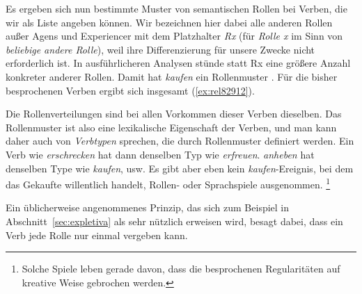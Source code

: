 

Es ergeben sich nun bestimmte Muster von semantischen Rollen bei Verben, die wir als Liste angeben können.
Wir bezeichnen hier dabei alle anderen Rollen außer Agens und Experiencer mit dem Platzhalter \textit{Rx} (für \textit{Rolle x} im Sinn von \textit{beliebige andere Rolle}), weil ihre Differenzierung für unsere Zwecke nicht erforderlich ist.
In ausführlicheren Analysen stünde statt Rx eine größere Anzahl konkreter anderer Rollen.
Damit hat \zB \textit{kaufen} ein Rollenmuster .
Für die bisher besprochenen Verben ergibt sich insgesamt (\ref{ex:rel82912}).

\begin{exe}
  \ex\label{ex:rel82912}
  \begin{xlist}
  \end{xlist}
\end{exe}

Die Rollenverteilungen sind bei allen Vorkommen dieser Verben dieselben.
Das Rollenmuster ist also eine lexikalische Eigenschaft der Verben, und man kann daher auch von \textit{Verbtypen} sprechen, die durch Rollenmuster definiert werden.
Ein Verb wie \textit{erschrecken} hat dann denselben Typ wie \textit{erfreuen}.
\textit{anheben} hat denselben Type wie \textit{kaufen}, usw.
Es gibt aber eben kein \textit{kaufen}-Ereignis, bei dem das Gekaufte willentlich handelt, Rollen- oder Sprachspiele ausgenommen.%
\footnote{Solche Spiele leben gerade davon, dass die besprochenen Regularitäten auf kreative Weise gebrochen werden.}

Ein üblicherweise angenommenes Prinzip, das sich zum Beispiel in Abschnitt~\ref{sec:expletiva} als sehr nützlich erweisen wird, besagt dabei, dass ein Verb jede Rolle nur einmal vergeben kann.


